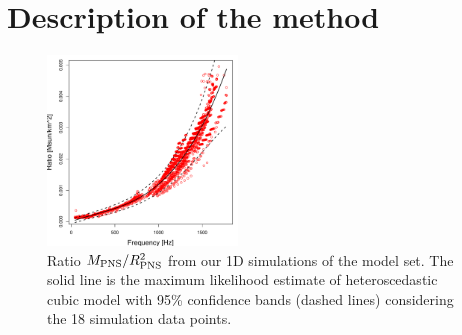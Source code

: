\section{Description of the method}
\label{methods}

\begin{figure}[t]
 \centering
 \includegraphics[width=0.45\textwidth]{plots/model}
 \caption{Ratio $M_{\rm PNS}/R_{\rm PNS}^2$ from our  1D simulations of the model set. The solid line is the maximum likelihood estimate of heteroscedastic cubic model with 95\% confidence bands (dashed lines) considering the 18 simulation data points.  } 
 \label{fig:LMVAR}
\end{figure}

